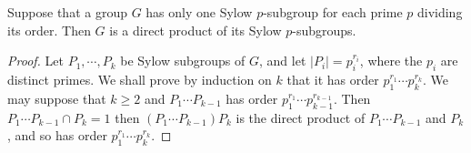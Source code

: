 \begin{corollary}
  \label{corollary-direct-product-of-Sylow-p-subgroups}
  Suppose that a group \( G \) has only one Sylow \( p \)-subgroup for each prime \( p \) dividing its order.
  Then \( G \) is a direct product of its Sylow \( p \)-subgroups.
\end{corollary}
\begin{proof}
  Let \( P_1, \cdots, P_k \) be Sylow subgroups of \( G \), and let \( \left\vert P_i \right\vert = p^{r_i}_i \), where the \( p_i \) are distinct primes.
  We shall prove by induction on \( k \) that it has order \( p^{r_1}_1 \cdots p^{r_k}_k \).
  We may suppose that \( k \geq 2 \) and \( P_1 \cdots P_{k - 1} \) has order \( p^{r_1}_1\cdots p^{r_{k - 1}}_{k - 1} \).
  Then \( P_1 \cdots P_{k - 1} \cap P_k = 1 \) then \( (P_1 \cdots P_{k - 1})P_k \) is the direct product of \( P_1 \cdots P_{k - 1} \) and \( P_k \), and so has order \( p^{r_1}_1 \cdots p^{r_k}_k \).
\end{proof}


